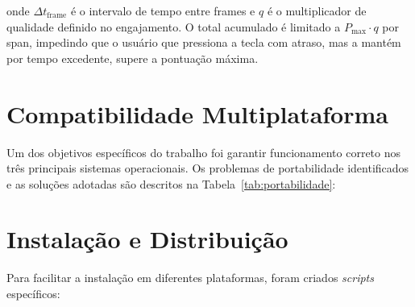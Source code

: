 \documentclass[
  12pt,
  openright,
  twoside,
  a4paper,
  english,
  brazil
]{abntex2}
\begin{document}
onde $\Delta t_{\text{frame}}$ é o intervalo de tempo entre frames e $q$
é o multiplicador de qualidade definido no engajamento. O total acumulado
é limitado a $P_{\max} \cdot q$ por span, impedindo que o usuário que
pressiona a tecla com atraso, mas a mantém por tempo excedente, supere a
pontuação máxima.

\section{Compatibilidade Multiplataforma}

Um dos objetivos específicos do trabalho foi garantir funcionamento
correto nos três principais sistemas operacionais. Os problemas de
portabilidade identificados e as soluções adotadas são descritos na
Tabela~\ref{tab:portabilidade}:

\begin{table}[htbp]
  \centering
  \caption{Problemas de portabilidade e soluções adotadas.}
  \label{tab:portabilidade}
\end{table}

\section{Instalação e Distribuição}

Para facilitar a instalação em diferentes plataformas, foram criados
\textit{scripts} específicos:
\end{document}
